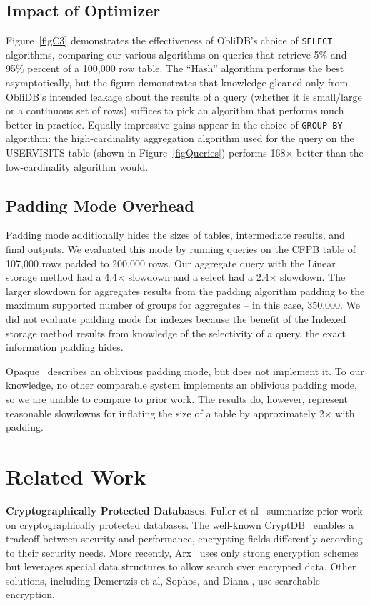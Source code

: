 \documentclass[letterpaper,twocolumn,10pt]{article}
\def\name/{ObliDB}
\begin{document}
\subsection{Impact of Optimizer}
Figure~\ref{figC3} demonstrates the effectiveness of \name/'s choice of \texttt{SELECT} algorithms, comparing our various algorithms on queries that retrieve 5\% and 95\% percent of a 100,000 row table. The ``Hash'' algorithm performs the best asymptotically, but the figure demonstrates that knowledge gleaned only from \name/'s intended leakage about the results of a query (whether it is small/large or a continuous set of rows) suffices to pick an algorithm that performs much better in practice. Equally impressive gains appear in the choice of \texttt{GROUP BY} algorithm: the high-cardinality aggregation algorithm used for the query on the USERVISITS table (shown in Figure~\ref{figQueries}) performs 168$\times$ better than the low-cardinality algorithm would.

\subsection{Padding Mode Overhead}
Padding mode additionally hides the sizes of tables, intermediate results, and final outputs. We evaluated this mode by running queries on the CFPB table of 107,000 rows padded to 200,000 rows. Our aggregate query with the Linear storage method had a 4.4$\times$ slowdown and a select had a 2.4$\times$ slowdown. The larger slowdown for aggregates results from the padding algorithm padding to the maximum supported number of groups for aggregates -- in this case, 350,000. We did not evaluate padding mode for indexes because the benefit of the Indexed storage method results from knowledge of the selectivity of a query, the exact information padding hides.

Opaque~\cite{ZDB+17} describes an oblivious padding mode, but does not implement it. To our knowledge, no other comparable system implements an oblivious padding mode, so we are unable to compare to prior work. The results do, however, represent reasonable slowdowns for inflating the size of a table by approximately 2$\times$ with padding.

\section{Related Work}\label{related}

  \noindent \textbf{Cryptographically Protected Databases}.
Fuller et al~\cite{FVY+17} summarize prior work on cryptographically protected databases. The well-known CryptDB~\cite{PRZB12} enables a tradeoff between security and performance, encrypting fields differently according to their security needs. More recently, Arx~\cite{PBP16} uses only strong encryption schemes but leverages special data structures to allow search over encrypted data. Other solutions, including Demertzis et al, Sophos, and Diana \cite{DPP+16, Bost16, BMO17}, use searchable encryption.
\end{document}
